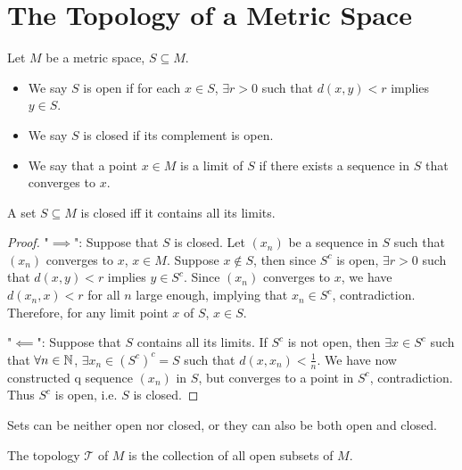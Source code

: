 \section{The Topology of a Metric Space}

\begin{df}
    Let $M$ be a metric space, $S\subseteq M$.
    \begin{itemize}
        \item We say $S$ is open if for each $x\in S$, $\exists r > 0$ such that $d(x, y) < r$ implies $y\in S$.
        \item We say $S$ is closed if its complement is open.
        \item We say that a point $x\in M$ is a limit of $S$ if there exists a sequence in $S$ that converges to $x$.
    \end{itemize}
\end{df}

\begin{prop}
    A set $S\subseteq M$ is closed iff it contains all its limits.
    \begin{proof}
        "$\implies$": Suppose that $S$ is closed. Let $(x_n)$ be a sequence in $S$ such that $(x_n)$ converges to $x$, $x\in M$. Suppose $x\notin S$, then since $S^c$ is open, $\exists r>0$ such that $d(x, y) < r$ implies $y\in S^c$. Since $(x_n)$ converges to $x$, we have $d(x_n, x) < r$ for all $n$ large enough, implying that $x_n \in S^c$, contradiction. Therefore, for any limit point $x$ of $S$, $x\in S$.

        "$\impliedby$": Suppose that $S$ contains all its limits. If $S^c$ is not open, then $\exists x \in S^c$ such that $\forall n\in {\mathbb N}$, $\exists x_n\in (S^c)^c = S$ such that $d(x, x_n) < \frac1n$. We have now constructed q sequence $(x_n)$ in $S$, but converges to a point in $S^c$, contradiction. Thus $S^c$ is open, i.e. $S$ is closed.
    \end{proof}
\end{prop}

\begin{rmk}
    Sets can be neither open nor closed, or they can also be both open and closed.
\end{rmk}

\begin{df}
    The topology $\mathcal T$ of $M$ is the collection of all open subsets of $M$.
\end{df}

